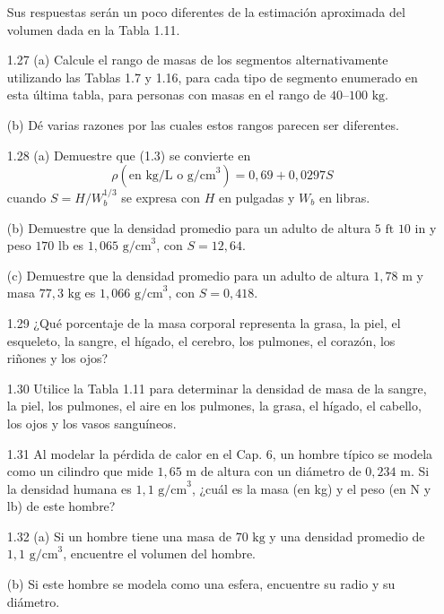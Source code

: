 \documentclass[12pt]{book}
\begin{document}
\begin{enumerate}
  Sus respuestas serán un poco diferentes de la estimación aproximada del volumen dada en la Tabla 1.11.

\item[1.27] (a) Calcule el rango de masas de los segmentos alternativamente utilizando las Tablas 1.7 y 1.16, para cada tipo de segmento enumerado en esta última tabla, para personas con masas en el rango de $40\text{--}100\text{ kg}$.
  
  (b) Dé varias razones por las cuales estos rangos parecen ser diferentes.

\item[1.28] (a) Demuestre que (1.3) se convierte en
  \begin{equation}
  \rho (\text{en kg/L o g/cm}^3) = 0,69 + 0,0297 S
  \label{eq:1.7}
  \end{equation}
  cuando $S = H/W_b^{1/3}$ se expresa con $H$ en pulgadas y $W_b$ en libras.
  
  (b) Demuestre que la densidad promedio para un adulto de altura $5\text{ ft } 10\text{ in}$ y peso $170\text{ lb}$ es $1,065\text{ g/cm}^3$, con $S = 12,64$.
  
  (c) Demuestre que la densidad promedio para un adulto de altura $1,78\text{ m}$ y masa $77,3\text{ kg}$ es $1,066\text{ g/cm}^3$, con $S = 0,418$.

\item[1.29] ¿Qué porcentaje de la masa corporal representa la grasa, la piel, el esqueleto, la sangre, el hígado, el cerebro, los pulmones, el corazón, los riñones y los ojos?

\item[1.30] Utilice la Tabla 1.11 para determinar la densidad de masa de la sangre, la piel, los pulmones, el aire en los pulmones, la grasa, el hígado, el cabello, los ojos y los vasos sanguíneos.

\item[1.31] Al modelar la pérdida de calor en el Cap. 6, un hombre típico se modela como un cilindro que mide $1,65\text{ m}$ de altura con un diámetro de $0,234\text{ m}$. Si la densidad humana es $1,1\text{ g/cm}^3$, ¿cuál es la masa (en kg) y el peso (en N y lb) de este hombre?

\item[1.32] (a) Si un hombre tiene una masa de $70\text{ kg}$ y una densidad promedio de $1,1\text{ g/cm}^3$, encuentre el volumen del hombre.
  
  (b) Si este hombre se modela como una esfera, encuentre su radio y su diámetro.


\end{enumerate}
\end{document}
